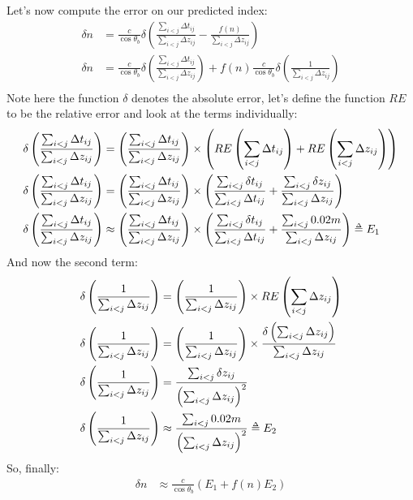 Let's now compute the error on our predicted index:
\begin{align}
  \delta n &= \frac{c}{\cos{\theta_b}}\delta\left(\frac{\sum_{i<j}\Delta t_{ij}}{\sum_{i<j} \Delta z_{ij}} - \frac{f(n)}{\sum_{i<j} \Delta z_{ij}}\right)\\
  \delta n &= \frac{c}{\cos{\theta_b}}\delta\left(\frac{\sum_{i<j}\Delta t_{ij}}{\sum_{i<j} \Delta z_{ij}}\right)+ f(n)\frac{c}{\cos{\theta_b}}\delta\left(\frac{1}{\sum_{i<j} \Delta z_{ij}}\right)\\
\end{align}
Note here the function $\delta$ denotes the absolute error, let's define the function $RE$ to be the relative error and look at the terms individually:
\begin{align}
  \delta\left(\frac{\sum_{i<j}\Delta t_{ij}}{\sum_{i<j} \Delta z_{ij}}\right) &= \left(\frac{\sum_{i<j}\Delta t_{ij}}{\sum_{i<j} \Delta z_{ij}}\right)\times\left(RE\left(\sum_{i<j}\Delta t_{ij}\right) + RE\left(\sum_{i<j} \Delta z_{ij}\right)\right)\\
\delta\left(\frac{\sum_{i<j}\Delta t_{ij}}{\sum_{i<j} \Delta z_{ij}}\right) &= \left(\frac{\sum_{i<j}\Delta t_{ij}}{\sum_{i<j} \Delta z_{ij}}\right)\times\left(\frac{\sum_{i<j}\delta t_{ij}}{\sum_{i<j}\Delta t_{ij}} + \frac{\sum_{i<j}\delta z_{ij}}{\sum_{i<j}\Delta z_{ij}}\right)\\
\delta\left(\frac{\sum_{i<j}\Delta t_{ij}}{\sum_{i<j} \Delta z_{ij}}\right) &\approx \left(\frac{\sum_{i<j}\Delta t_{ij}}{\sum_{i<j} \Delta z_{ij}}\right)\times\left(\frac{\sum_{i<j}\delta t_{ij}}{\sum_{i<j}\Delta t_{ij}} + \frac{\sum_{i<j}0.02m}{\sum_{i<j}\Delta z_{ij}}\right) \delequal E_1\\
\end{align}
And now the second term:
\begin{align}
  \delta\left(\frac{1}{\sum_{i<j} \Delta z_{ij}}\right) &= \left(\frac{1}{\sum_{i<j} \Delta z_{ij}}\right)\times RE\left(\sum_{i<j}\Delta z_{ij}\right) \\
  \delta\left(\frac{1}{\sum_{i<j} \Delta z_{ij}}\right) &= \left(\frac{1}{\sum_{i<j} \Delta z_{ij}}\right)\times \frac{\delta\left(\sum_{i<j}\Delta z_{ij}\right)}{\sum_{i<j}\Delta z_{ij}} \\
  \delta\left(\frac{1}{\sum_{i<j} \Delta z_{ij}}\right) &= \frac{\sum_{i<j}\delta z_{ij}}{\left(\sum_{i<j}\Delta z_{ij}\right)^2} \\
  \delta\left(\frac{1}{\sum_{i<j} \Delta z_{ij}}\right) &\approx \frac{\sum_{i<j}0.02m}{\left(\sum_{i<j}\Delta z_{ij}\right)^2} \delequal E_2\\
\end{align}
So, finally:
\begin{align}
  \delta n &\approx \frac{c}{\cos\theta_b}\left(E_1 + f(n)E_2\right)
\end{align}
